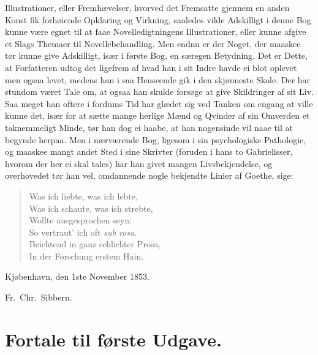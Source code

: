 \documentclass[12pt,a4paper]{book}
\newcommand{\opage}[1]{\marginnote{\footnotesize\textit{[#1]}}}
\begin{document}
Illustrationer, eller Fremhævelser, hvorved det Fremsatte gjennem en
anden Konst fik forhøiende Opklaring og Virkning, saaledes vilde
Adskilligt i denne Bog kunne være egnet til at faae Novelledigtningens
Illustrationer, eller kunne afgive et Slags Themaer til
Novellebehandling. Men endnu er der Noget, der maaskee tør kunne give
Adskilligt, især i første Bog, en særegen Betydning. Det er Dette, at
Forfatteren udtog det ligefrem af hvad han i sit Indre havde ei blot
oplevet men ogsaa levet, medens han i saa Henseende gik i den
skjønneste Skole. Der har stundom været Tale om, at ogsaa han skulde
forsøge at give Skildringer af sit Liv. Saa meget han oftere i fordums
Tid har glædet sig ved Tanken om engang at ville kunne det, især for at
sætte mange herlige Mænd og Qvinder af sin Omverden et taknemmeligt
Minde, tør han dog ei haabe, at han nogensinde vil naae til at begynde
herpaa. Men i nærværende \opage{V} Bog, ligesom i sin psychologiske Pathologie,
og maaskee mangt andet Sted i sine Skrivter (foruden i hans to
Gabrielisser, hvorom der her ei skal tales) har han givet mangen
Livsbekjendelse, og overhovedet tør han vel, omdannende nogle bekjendte
Linier af Goethe, sige:

\begin{verse}
Was ich liebte, was ich lebte,\\
Was ich schaute, was ich strebte,\\
Wollte ausgesprochen seyn;\\
So vertraut' ich oft \textit{sub rosa}.\\
Beichtend in ganz schlichter Prosa,\\
In der Forschung erstem Hain.
\end{verse}

\noindent Kjøbenhavn, den 1ste November 1853.
\begin{flushright}
Fr.\ Chr.\ Sibbern.
\end{flushright}

\chapter*{Fortale til første Udgave.}
\end{document}

